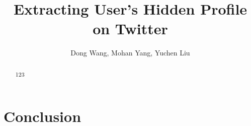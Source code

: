 \documentclass{sig-alternate}
\title{Extracting User's Hidden Profile on Twitter}
\author{Dong Wang, Mohan Yang, Yuchen Liu}
\begin{document}
\maketitle

\begin{abstract}
123
\end{abstract}








\section{Conclusion}\label{sec:conclusion}

{ }
\end{document}
